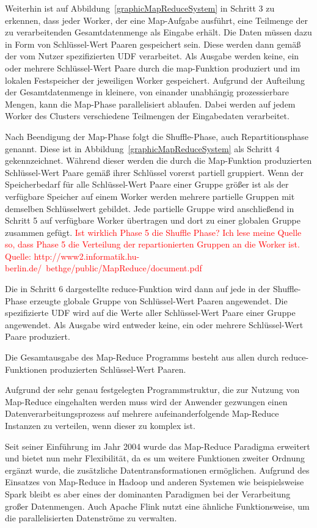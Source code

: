 Weiterhin ist auf Abbildung~\ref{graphicMapReduceSystem} in Schritt 3 zu erkennen, dass jeder Worker, der eine Map-Aufgabe ausführt, eine Teilmenge der zu verarbeitenden Gesamtdatenmenge als Eingabe erhält. Die Daten müssen dazu in Form von Schlüssel-Wert Paaren gespeichert sein. Diese werden dann gemäß der vom Nutzer spezifizierten UDF verarbeitet. Als Ausgabe werden keine, ein oder mehrere Schlüssel-Wert Paare durch die map-Funktion produziert und im lokalen Festspeicher der jeweiligen Worker gespeichert. Aufgrund der Aufteilung der Gesamtdatenmenge in kleinere, von einander unabhängig prozessierbare Mengen, kann die Map-Phase parallelisiert ablaufen. Dabei werden auf jedem Worker des Clusters verschiedene Teilmengen der Eingabedaten verarbeitet. 

Nach Beendigung der Map-Phase folgt die Shuffle-Phase, auch Repartitionsphase genannt. Diese ist in Abbildung~\ref{graphicMapReduceSystem} als Schritt 4 gekennzeichnet. Während dieser werden die durch die Map-Funktion produzierten Schlüssel-Wert Paare gemäß ihrer Schlüssel vorerst partiell gruppiert. Wenn der Speicherbedarf für alle Schlüssel-Wert Paare einer Gruppe größer ist als der verfügbare Speicher auf einem Worker werden mehrere partielle Gruppen mit demselben Schlüsselwert gebildet. Jede partielle Gruppe wird anschließend in Schritt 5 auf verfügbare Worker übertragen und dort zu einer globalen Gruppe zusammen gefügt. \textcolor{red}{Ist wirklich Phase 5 die Shuffle Phase? Ich lese meine Quelle so, dass Phase 5 die Verteilung der repartionierten Gruppen an die Worker ist. Quelle: http://www2.informatik.hu-berlin.de/~bethge/public/MapReduce/document.pdf}

Die in Schritt 6 dargestellte reduce-Funktion wird dann auf jede in der Shuffle-Phase erzeugte globale Gruppe von Schlüssel-Wert Paaren angewendet. Die spezifizierte UDF wird auf die Werte aller Schlüssel-Wert Paare einer Gruppe angewendet. Als Ausgabe wird entweder keine, ein oder mehrere Schlüssel-Wert Paare produziert. 

Die Gesamtausgabe des Map-Reduce Programms besteht aus allen durch reduce-Funktionen produzierten Schlüssel-Wert Paaren.

Aufgrund der sehr genau festgelegten Programmstruktur, die zur Nutzung von Map-Reduce eingehalten werden muss wird der Anwender gezwungen einen Datenverarbeitungsprozess auf mehrere aufeinanderfolgende Map-Reduce Instanzen zu verteilen, wenn dieser zu komplex ist. 
 
Seit seiner Einführung im Jahr 2004 wurde das Map-Reduce Paradigma erweitert und bietet nun mehr Flexibilität, da es um weitere Funktionen zweiter Ordnung ergänzt wurde, die zusätzliche Datentransformationen ermöglichen. Aufgrund des Einsatzes von Map-Reduce in Hadoop \cite{HadoopWebsite} und anderen Systemen wie beispielsweise Spark \cite{Zaharia2010} bleibt es aber eines der dominanten Paradigmen bei der Verarbeitung großer Datenmengen. Auch Apache Flink \cite{FlinkWebsite} nutzt eine ähnliche Funktionsweise, um die parallelisierten Datenströme zu verwalten.

